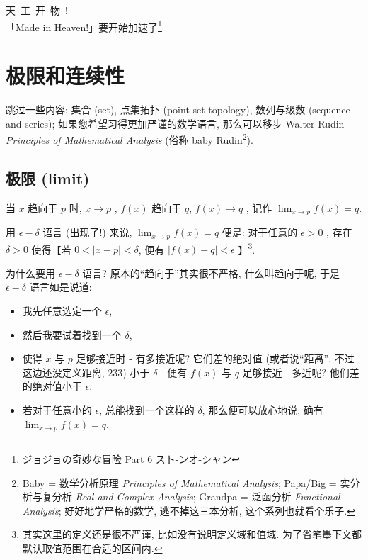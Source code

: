 \begin{flushright}{\kaishu 天\ 工\ 开\ 物\ !\\「Made in Heaven!」要开始加速了\footnote{ジョジョの奇妙な冒险 Part 6
  スト-ンオ-シャン}}\end{flushright}

\section{极限和连续性}\label{011}

跳过一些内容: 集合 (set), 点集拓扑 (point set topology), 数列与级数
(sequence and series); 如果您希望习得更加严谨的数学语言, 那么可以移步
Walter Rudin - \emph{Principles of Mathematical Analysis} (俗称 baby
Rudin\footnote{Baby = 数学分析原理 \emph{Principles of Mathematical
  Analysis}; Papa/Big = 实分析与复分析 \emph{Real and Complex Analysis};
  Grandpa = 泛函分析 \emph{Functional Analysis}; 好好地学严格的数学,
  逃不掉这三本分析, 这个系列也就看个乐子.}).

\subsection{极限 (limit)}

\begin{tcolorbox}[size=fbox, breakable, enhanced jigsaw, title={定义}]
当 $x$ 趋向于 $p$ 时, $x\rightarrow p$ , $f(x)$
趋向于 $q$, $f(x)\rightarrow q$ , 记作
$\lim_{x\rightarrow p}f(x)=q.$

用 $\epsilon - \delta$ 语言 (出现了!) 来说,
$\lim_{x\rightarrow p}f(x)=q$ 便是: 对于任意的 $\epsilon>0$ , 存在
$\delta>0$ 使得【若 $0<|x-p|<\delta$, 便有 $|f(x)-q|<\epsilon$
】\footnote{其实这里的定义还是很不严谨, 比如没有说明定义域和值域.
  为了省笔墨下文都默认取值范围在合适的区间内.}.

\end{tcolorbox}

为什么要用 $\epsilon - \delta$ 语言? 原本的``趋向于''其实很不严格,
什么叫趋向于呢, 于是 $\epsilon - \delta$ 语言如是说道:

\begin{itemize}

\item
  我先任意选定一个 $\epsilon$,
\item
  然后我要试着找到一个 $\delta$,
\item
  使得 $x$ 与 $p$ 足够接近时 - 有多接近呢? 它们差的绝对值
  (或者说``距离'', 不过这边还没定义距离, 233) 小于 $\delta$ - 便有
  $f(x)$ 与 $q$ 足够接近 - 多近呢? 他们差的绝对值小于 $\epsilon$.
\item
  若对于任意小的 $\epsilon$, 总能找到一个这样的 $\delta$,
  那么便可以放心地说, 确有$\lim_{x\rightarrow p}f(x)=q$.
\end{itemize}

